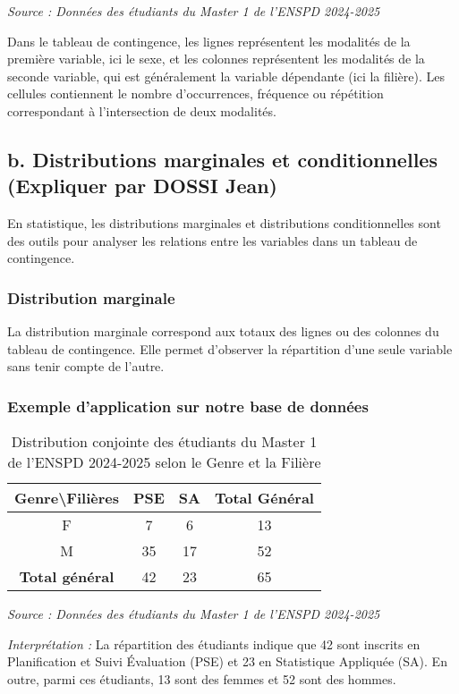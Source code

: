 \documentclass[a4paper,12pt]{article}
\begin{document}
\textit{Source : Données des étudiants du Master 1 de l’ENSPD 2024-2025}

Dans le tableau de contingence, les lignes représentent les modalités de la première variable, ici le sexe, et les colonnes représentent les modalités de la seconde variable, qui est généralement la variable dépendante (ici la filière). Les cellules contiennent le nombre d’occurrences, fréquence ou répétition correspondant à l’intersection de deux modalités.

\subsection{b. Distributions marginales et conditionnelles (Expliquer par DOSSI Jean)}

En statistique, les distributions marginales et distributions conditionnelles sont des outils pour analyser les relations entre les variables dans un tableau de contingence.

\subsubsection*{Distribution marginale}
La distribution marginale correspond aux totaux des lignes ou des colonnes du tableau de contingence. Elle permet d'observer la répartition d'une seule variable sans tenir compte de l'autre.

\subsubsection*{Exemple d’application sur notre base de données}
\begin{table}[h!]
\centering
\caption{Distribution conjointe des étudiants du Master 1 de l’ENSPD 2024-2025 selon le Genre et la Filière}
\begin{tabular}{|c|c|c|c|}
\hline
\textbf{Genre\textbackslash Filières} & \textbf{PSE} & \textbf{SA} & \textbf{Total Général} \\
\hline
F & 7 & 6 & 13 \\
M & 35 & 17 & 52 \\
\hline
\textbf{Total général} & 42 & 23 & 65 \\
\hline
\end{tabular}
\end{table}

\textit{Source : Données des étudiants du Master 1 de l’ENSPD 2024-2025}

\textit{Interprétation :} La répartition des étudiants indique que 42 sont inscrits en Planification et Suivi Évaluation (PSE) et 23 en Statistique Appliquée (SA). En outre, parmi ces étudiants, 13 sont des femmes et 52 sont des hommes. 
\end{document}
